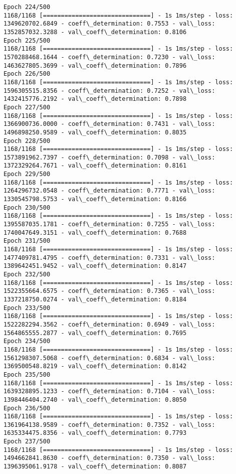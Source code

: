 \documentclass[11pt]{article}
\begin{document}
\begin{Verbatim}[commandchars=\\\{\}]
Epoch 224/500
1168/1168 [==============================] - 1s 1ms/step - loss: 1349620702.6849 - coeff\_determination: 0.7553 - val\_loss: 1352857032.3288 - val\_coeff\_determination: 0.8106
Epoch 225/500
1168/1168 [==============================] - 1s 1ms/step - loss: 1570288468.1644 - coeff\_determination: 0.7230 - val\_loss: 1463627805.3699 - val\_coeff\_determination: 0.7896
Epoch 226/500
1168/1168 [==============================] - 1s 1ms/step - loss: 1596305515.8356 - coeff\_determination: 0.7252 - val\_loss: 1432415776.2192 - val\_coeff\_determination: 0.7898
Epoch 227/500
1168/1168 [==============================] - 1s 1ms/step - loss: 1366900736.0000 - coeff\_determination: 0.7431 - val\_loss: 1496898250.9589 - val\_coeff\_determination: 0.8035
Epoch 228/500
1168/1168 [==============================] - 1s 1ms/step - loss: 1573891962.7397 - coeff\_determination: 0.7098 - val\_loss: 1372329264.7671 - val\_coeff\_determination: 0.8161
Epoch 229/500
1168/1168 [==============================] - 1s 1ms/step - loss: 1264296732.0548 - coeff\_determination: 0.7771 - val\_loss: 1330545798.5753 - val\_coeff\_determination: 0.8166
Epoch 230/500
1168/1168 [==============================] - 1s 1ms/step - loss: 1395587035.1781 - coeff\_determination: 0.7255 - val\_loss: 1740047649.3151 - val\_coeff\_determination: 0.7688
Epoch 231/500
1168/1168 [==============================] - 1s 1ms/step - loss: 1477409781.4795 - coeff\_determination: 0.7331 - val\_loss: 1389642451.9452 - val\_coeff\_determination: 0.8147
Epoch 232/500
1168/1168 [==============================] - 1s 1ms/step - loss: 1522355664.6575 - coeff\_determination: 0.7365 - val\_loss: 1337218750.0274 - val\_coeff\_determination: 0.8184
Epoch 233/500
1168/1168 [==============================] - 1s 1ms/step - loss: 1522282294.3562 - coeff\_determination: 0.6949 - val\_loss: 1564865555.2877 - val\_coeff\_determination: 0.7695
Epoch 234/500
1168/1168 [==============================] - 1s 1ms/step - loss: 1561298307.5068 - coeff\_determination: 0.6834 - val\_loss: 1369500548.8219 - val\_coeff\_determination: 0.8142
Epoch 235/500
1168/1168 [==============================] - 1s 1ms/step - loss: 1639328895.1233 - coeff\_determination: 0.7104 - val\_loss: 1398446404.2740 - val\_coeff\_determination: 0.8050
Epoch 236/500
1168/1168 [==============================] - 1s 1ms/step - loss: 1361964138.9589 - coeff\_determination: 0.7352 - val\_loss: 1635334475.8356 - val\_coeff\_determination: 0.7793
Epoch 237/500
1168/1168 [==============================] - 1s 1ms/step - loss: 1494662841.8630 - coeff\_determination: 0.7350 - val\_loss: 1396395061.9178 - val\_coeff\_determination: 0.8087

\end{Verbatim}
\end{document}
